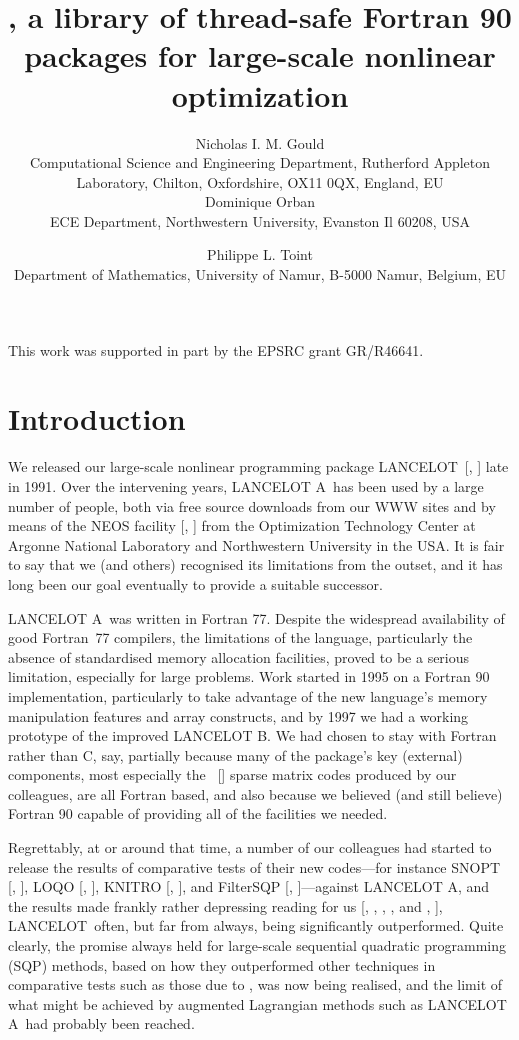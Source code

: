 \documentclass[acmtocl,acmnow]{acmtrans2m}
\title{\gal, a library of thread-safe Fortran 90 
packages for large-scale nonlinear optimization}
\author{Nicholas I. M. Gould \\ 
Computational Science and Engineering Department,
Rutherford Appleton Laboratory, 
Chilton, Oxfordshire, OX11 0QX, England, EU \\
Dominique Orban \\
ECE Department,  Northwestern University, Evanston Il 60208, USA
\and Philippe L. Toint \\
Department of Mathematics, University of Namur, 
B-5000 Namur, Belgium, EU }
\newcommand{\lan}{{\sf LANCELOT}}
\newcommand{\lana}{{\sf LANCELOT A}}
\newcommand{\lanb}{{\sf LANCELOT B}}
\newcommand{\resetcounters}{\setcounter{equation}{0} \setcounter{figure}{0} 
 \setcounter{table}{0}}
\newcommand{\lsection}[1]{\section{#1} \resetcounters \label{#1}}
\newcommand{\citebb}[1]{\citeauthor{#1}\ [\citeyear{#1}]}
\newcommand{\bciteb}[1]{\citeauthor{#1}, \citeyear{#1}}
\begin{document}
            




\begin{bottomstuff} 
This work was supported in part by the EPSRC grant GR/R46641.
\end{bottomstuff}
            
\maketitle

\lsection{Introduction}

We released our large-scale nonlinear programming package \lan\
[\bciteb{ConnGoulToin92}] late in 1991. Over the intervening
years, \lana\ has been used by a large number of people, both
via free source downloads from our WWW sites
and by means of the NEOS facility [\bciteb{CzyzMessMore98}]
from the Optimization Technology Center at
Argonne National Laboratory and Northwestern University in the USA.
It is fair to say that we (and others) recognised its limitations
from the outset, and it has long been our goal eventually to provide 
a suitable successor.

\lana\ was written in Fortran 77. 
Despite the widespread availability of good 
Fortran~77 compilers, the limitations of the language, particularly
the absence of standardised memory allocation facilities, proved to be
a serious limitation, especially for large problems. 
Work started in 1995 on a Fortran 90 implementation,
particularly to take advantage of the new language's 
memory manipulation features and array constructs, and by 1997 we had a 
working prototype of the improved \lanb. We had chosen to stay with
Fortran rather than C, say, partially because many of the package's 
key (external) components, most especially the \citebb{hsl:2002}
sparse matrix codes
produced by our colleagues, are all Fortran based, and also because
we believed (and still believe) Fortran 90 capable of providing
all of the facilities we needed.

Regrettably, at or around that time, a number of our colleagues 
had started to release the results of comparative tests of their
new codes---for instance SNOPT [\bciteb{gillmurrsaun02:siopt}],
LOQO [\bciteb{VandShan99}], 
KNITRO [\bciteb{ByrdHribNoce99:siopt}], and
FilterSQP [\bciteb{FletLeyf02}]---against \lana,
and the results made frankly rather depressing reading for us
[\bciteb{DolaMore00}, \bciteb{BensShanVand01}, and \bciteb{Chin01}], \lan\
often, but far from always, being significantly outperformed. 
Quite clearly, the promise always held for large-scale 
sequential quadratic programming (SQP) methods,
based on how they outperformed other techniques in comparative tests
such as those due to \cite{HockSchi81}, was now being realised, and the 
limit of what might be achieved by augmented Lagrangian methods
such as \lana\ had probably been reached.
\end{document}
